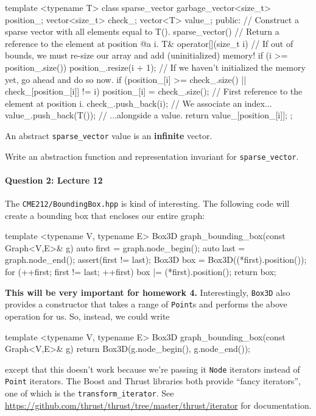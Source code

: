 \documentclass[12pt,letterpaper,twoside]{article}
\begin{document}
\newpage
\begin{cpp}
template <typename T> 
class sparse_vector {
  garbage_vector<size_t> position_;
  vector<size_t> check_;
  vector<T> value_;
 public:
  // Construct a sparse vector with all elements equal to T().
  sparse_vector() {}
  // Return a reference to the element at position @a i.
  T& operator[](size_t i) {
    // If out of bounds, we must re-size our array and add (uninitialized) memory!
    if (i >= position_.size())
      position_.resize(i + 1);
    // If we haven't initialized the memory yet, go ahead and do so now.
    if (position_[i] >= check_.size() || check_[position_[i]] != i) {
      position_[i] = check_.size(); // First reference to the element at position i.
      check_.push_back(i);          // We associate an index...
      value_.push_back(T());        // ...alongside a value.
    }
    return value_[position_[i]];
  }
};
\end{cpp}

An abstract \texttt{sparse\_vector} value is an \textbf{infinite} vector.

Write an abstraction function and representation invariant for
\texttt{sparse\_vector}.

\begin{solution}
 
\end{solution}



\paragraph{Question 2: Lecture 12} The \texttt{CME212/BoundingBox.hpp} is kind of interesting. The following code will create a bounding box that encloses our entire graph:
\begin{cpp}
template <typename V, typename E>
Box3D graph_bounding_box(const Graph<V,E>& g) {
  auto first = graph.node_begin();
  auto last  = graph.node_end();
  assert(first != last);
  Box3D box = Box3D((*first).position());
  for (++first; first != last; ++first)
    box |= (*first).position();
  return box;
}
\end{cpp}
\textbf{This will be very important for homework 4.}
Interestingly, \texttt{Box3D} also provides a constructor that takes a range of \texttt{Point}s and performs the above operation for us. So, instead, we could write
\begin{cpp}
template <typename V, typename E>
Box3D graph_bounding_box(const Graph<V,E>& g) {
  return Box3D(g.node_begin(), g.node_end());
}
\end{cpp}
except that this doesn't work because we're passing it \texttt{Node} iterators instead of \texttt{Point} iterators.
The Boost and Thrust libraries both provide ``fancy iterators'', one of which is the \texttt{transform\_iterator}. See
\href{https://github.com/thrust/thrust/tree/master/thrust/iterator}{https://github.com/thrust/thrust/tree/master/thrust/iterator}
for documentation.
\end{document}
